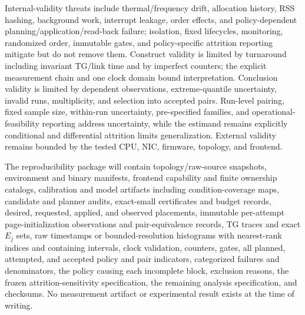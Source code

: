 Internal-validity threats include thermal/frequency drift, allocation history, RSS hashing, background work, interrupt leakage, order effects, and policy-dependent planning/application/read-back failure; isolation, fixed lifecycles, monitoring, randomized order, immutable gates, and policy-specific attrition reporting mitigate but do not remove them. Construct validity is limited by turnaround including invariant TG/link time and by imperfect counters; the explicit measurement chain and one clock domain bound interpretation. Conclusion validity is limited by dependent observations, extreme-quantile uncertainty, invalid runs, multiplicity, and selection into accepted pairs. Run-level pairing, fixed sample size, within-run uncertainty, pre-specified families, and operational-feasibility reporting address uncertainty, while the estimand remains explicitly conditional and differential attrition limits generalization. External validity remains bounded by the tested CPU, NIC, firmware, topology, and frontend.

The reproducibility package will contain topology/raw-source snapshots, environment and binary manifests, frontend capability and finite ownership catalogs, calibration and model artifacts including condition-coverage maps, candidate and planner audits, exact-small certificates and budget records, desired, requested, applied, and observed placements, immutable per-attempt page-initialization observations and pair-equivalence records, TG traces and exact $E_j$ sets, raw timestamps or bounded-resolution histograms with nearest-rank indices and containing intervals, clock validation, counters, gates, all planned, attempted, and accepted policy and pair indicators, categorized failures and denominators, the policy causing each incomplete block, exclusion reasons, the frozen attrition-sensitivity specification, the remaining analysis specification, and checksums. No measurement artifact or experimental result exists at the time of writing.
